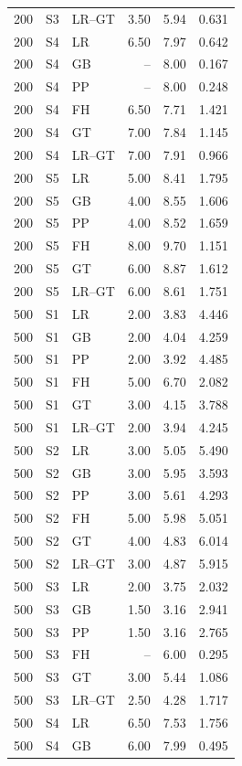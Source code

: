 \documentclass[12pt]{article}
\theoremstyle{definition}
\theoremstyle{remark}
\begin{document}
\begin{longtable}{rclrrr}
200 & S3 & LR--GT & 3.50 & 5.94 & 0.631 \\
200 & S4 & LR & 6.50 & 7.97 & 0.642 \\
200 & S4 & GB & -- & 8.00 & 0.167 \\
200 & S4 & PP & -- & 8.00 & 0.248 \\
200 & S4 & FH & 6.50 & 7.71 & 1.421 \\
200 & S4 & GT & 7.00 & 7.84 & 1.145 \\
200 & S4 & LR--GT & 7.00 & 7.91 & 0.966 \\
200 & S5 & LR & 5.00 & 8.41 & 1.795 \\
200 & S5 & GB & 4.00 & 8.55 & 1.606 \\
200 & S5 & PP & 4.00 & 8.52 & 1.659 \\
200 & S5 & FH & 8.00 & 9.70 & 1.151 \\
200 & S5 & GT & 6.00 & 8.87 & 1.612 \\
200 & S5 & LR--GT & 6.00 & 8.61 & 1.751 \\
500 & S1 & LR & 2.00 & 3.83 & 4.446 \\
500 & S1 & GB & 2.00 & 4.04 & 4.259 \\
500 & S1 & PP & 2.00 & 3.92 & 4.485 \\
500 & S1 & FH & 5.00 & 6.70 & 2.082 \\
500 & S1 & GT & 3.00 & 4.15 & 3.788 \\
500 & S1 & LR--GT & 2.00 & 3.94 & 4.245 \\
500 & S2 & LR & 3.00 & 5.05 & 5.490 \\
500 & S2 & GB & 3.00 & 5.95 & 3.593 \\
500 & S2 & PP & 3.00 & 5.61 & 4.293 \\
500 & S2 & FH & 5.00 & 5.98 & 5.051 \\
500 & S2 & GT & 4.00 & 4.83 & 6.014 \\
500 & S2 & LR--GT & 3.00 & 4.87 & 5.915 \\
500 & S3 & LR & 2.00 & 3.75 & 2.032 \\
500 & S3 & GB & 1.50 & 3.16 & 2.941 \\
500 & S3 & PP & 1.50 & 3.16 & 2.765 \\
500 & S3 & FH & -- & 6.00 & 0.295 \\
500 & S3 & GT & 3.00 & 5.44 & 1.086 \\
500 & S3 & LR--GT & 2.50 & 4.28 & 1.717 \\
500 & S4 & LR & 6.50 & 7.53 & 1.756 \\
500 & S4 & GB & 6.00 & 7.99 & 0.495 \\

\end{longtable}
\end{document}
